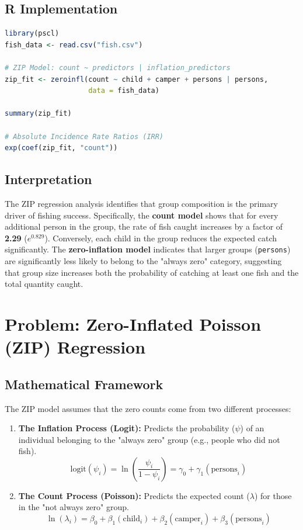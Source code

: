 \documentclass[12pt]{article}
\begin{document}
\subsection{R Implementation}
\begin{lstlisting}[language=R, caption=R Zero-Inflated Poisson]
library(pscl)
fish_data <- read.csv("fish.csv")

# ZIP Model: count ~ predictors | inflation_predictors
zip_fit <- zeroinfl(count ~ child + camper + persons | persons, 
                    data = fish_data)

summary(zip_fit)

# Absolute Incidence Rate Ratios (IRR)
exp(coef(zip_fit, "count"))
\end{lstlisting}

\subsection{Interpretation}
The ZIP regression analysis identifies that group composition is the primary driver of fishing success. Specifically, the \textbf{count model} shows that for every additional person in the group, the rate of fish caught increases by a factor of \textbf{2.29} ($e^{0.829}$). Conversely, each child in the group reduces the expected catch significantly. The \textbf{zero-inflation model} indicates that larger groups (\texttt{persons}) are significantly less likely to belong to the "always zero" category, suggesting that group size increases both the probability of catching at least one fish and the total quantity caught.

\section{Problem: Zero-Inflated Poisson (ZIP) Regression}

\subsection{Mathematical Framework}
The ZIP model assumes that the zero counts come from two different processes:
\begin{enumerate}
    \item \textbf{The Inflation Process (Logit):} Predicts the probability ($\psi$) of an individual belonging to the "always zero" group (e.g., people who did not fish).
    \[ \text{logit}(\psi_i) = \ln\left(\frac{\psi_i}{1-\psi_i}\right) = \gamma_0 + \gamma_1 (\text{persons}_i) \]
    \item \textbf{The Count Process (Poisson):} Predicts the expected count ($\lambda$) for those in the "not always zero" group.
    \[ \ln(\lambda_i) = \beta_0 + \beta_1 (\text{child}_i) + \beta_2 (\text{camper}_i) + \beta_3 (\text{persons}_i) \]
\end{enumerate}
\end{document}
